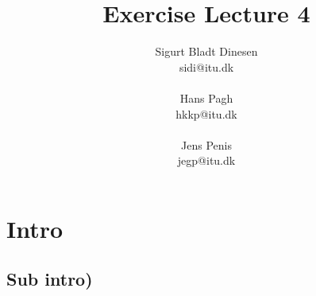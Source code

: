 \documentclass[a4paper, titlepage]{article}
\begin{document}
\title{Exercise Lecture 4}
\author{Sigurt Bladt Dinesen \\sidi{@}itu.dk \\\\Hans Pagh \\hkkp@itu.dk \\\\Jens
Penis \\jegp@itu.dk}
\maketitle
\tableofcontents
\pagebreak

\section*{Intro}
\subsection*{Sub intro)}
\end{document}
